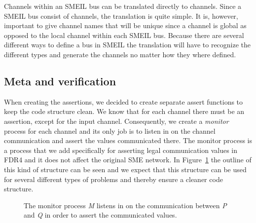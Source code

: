 Channels within an SMEIL bus can be translated directly to \cspm{} channels. Since a SMEIL bus consist of channels, the translation is quite simple. It is, however, important to give channel names that will be unique since a \cspm{} channel is global as opposed to the local channel within each SMEIL bus. Because there are several different ways to define a bus in SMEIL %
the translation will have to recognize the different types and generate the \cspm channels no matter how they where defined.


\subsection{Meta and verification}

When creating the assertions, we decided to create separate assert functions to keep the code structure clean. We know that for each \cspm{} channel there must be an assertion, except for the input channel.
Consequently, we create a \textit{monitor} process for each channel and its only job is to listen in on the channel communication and assert the values communicated there. The monitor process is a process that we add specifically for asserting legal communication values in FDR4 and it does not affect the original SME network.
In Figure~\ref{fig:assertion_process} the outline of this kind of structure can be seen and we expect that this structure can be used for several different types of problems and thereby ensure a cleaner code structure.


\begin{figure}[!ht]
  \centering
  \caption{The monitor process \textit{M} listens in on the communication between \textit{P} and \textit{Q} in order to assert the communicated values.}
  \label{fig:assertion_process}
\end{figure}

